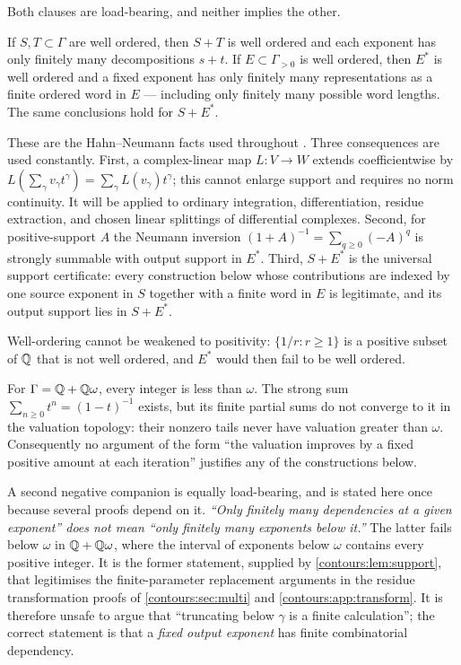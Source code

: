 \documentclass[11pt,letterpaper]{article}
\theoremstyle{definition}
\theoremstyle{remark}
\numberwithin{equation}{section}
\begin{document}
Both clauses are load-bearing, and neither implies the other.

\begin{lemma}\label{contours:lem:support}
If $S,T\subset\Gamma$ are well ordered, then $S+T$ is well ordered and each
exponent has only finitely many decompositions $s+t$. If $E\subset\Gamma_{>0}$ is
well ordered, then $E^*$ is well ordered and a fixed exponent has only finitely
many representations as a finite ordered word in $E$ --- including only finitely
many possible word lengths. The same conclusions hold for $S+E^*$.
\end{lemma}

These are the Hahn--Neumann facts used throughout \cite{Neumann,Poonen}. Three
consequences are used constantly. First, a complex-linear map $L:V\to W$ extends
coefficientwise by $L(\sum_\gamma v_\gamma t^\gamma)=\sum_\gamma L(v_\gamma)
t^\gamma$; this cannot enlarge support and requires no norm continuity. It will be
applied to ordinary integration, differentiation, residue extraction, and chosen
linear splittings of differential complexes. Second, for positive-support $A$ the
Neumann inversion $(1+A)^{-1}=\sum_{q\ge0}(-A)^q$ is strongly summable with output
support in $E^*$. Third, $S+E^*$ is the universal support certificate: every
construction below whose contributions are indexed by one source exponent in $S$
together with a finite word in $E$ is legitimate, and its output support lies in
$S+E^*$.

Well-ordering cannot be weakened to positivity: $\{1/r:r\ge1\}$ is a positive
subset of $\mathbb Q$ that is not well ordered, and $E^*$ would then fail to be well
ordered.

\begin{example}\label{contours:ex:rank}
For $\Gamma=\mathbb Q+\mathbb Q\omega$, every integer is less than $\omega$. The strong sum
$\sum_{n\ge0}t^n=(1-t)^{-1}$ exists, but its finite partial sums do not converge to
it in the valuation topology: their nonzero tails never have valuation greater than
$\omega$. Consequently no argument of the form ``the valuation improves by a fixed
positive amount at each iteration'' justifies any of the constructions below.
\end{example}

A second negative companion is equally load-bearing, and is stated here once
because several proofs depend on it. \emph{``Only finitely many dependencies at a
given exponent'' does not mean ``only finitely many exponents below it.''} The
latter fails below $\omega$ in $\mathbb Q+\mathbb Q\omega$, where the interval of exponents below
$\omega$ contains every positive integer. It is the former statement, supplied by
\cref{contours:lem:support}, that legitimises the finite-parameter replacement
arguments in the residue transformation proofs of \cref{contours:sec:multi} and
\cref{contours:app:transform}. It is therefore unsafe to argue that ``truncating
below $\gamma$ is a finite calculation''; the correct statement is that a
\emph{fixed output exponent} has finite combinatorial dependency.
\end{document}
